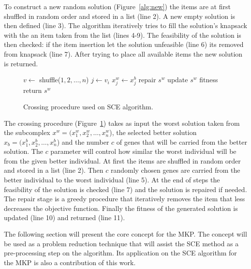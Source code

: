 To construct a new random solution (Figure~\ref{alg:new}) the items are
at first shuffled in random order and stored in a list (line 2).
A new empty solution is then defined (line 3).
The algorithm iteratively tries to fill the solution's knapsack with 
the an item taken from the list (lines 4-9).
The feasibility of the solution is then checked: if the item insertion let
the solution unfeasible (line 6) its removed from knapsack (line 7).
After trying to place all available items the new solution is returned.

\begin{figure}
\begin{algorithmic}[1]
    \State $v \leftarrow $ shuffle($1, 2, \ldots, n$)
	  \State $j \leftarrow v_i$
	  \State $x^w_j \leftarrow x^b_j$ 
	\EndFor
	  \State repair $s^w$
	\EndIf
	\State update $s^w$ fitness
  \State return $s^w$
  \EndProcedure
\end{algorithmic}
\caption{Crossing procedure used on SCE algorithm.}
\label{alg:cross}
\end{figure}

The crossing procedure (Figure~\ref{alg:cross}) takes as input the worst
solution taken from the subcomplex $x^w = (x^w_1, x^w_2, \ldots, x^w_n$),
the selected better solution $x_b = (x^b_1, x^b_2, \ldots, x^b_n$)
and the number $c$ of genes that will be carried from the better solution.
The $c$ parameter will control how similar the worst individual will be from the
given better individual.
At first the items are shuffled in random order and stored in a list (line 2).
Then $c$ randomly chosen genes are carried from the better individual to the worst
individual (line 5).
At the end of steps the feasibility of the solution is checked (line 7) and
the solution is repaired if needed.
The repair stage is a greedy procedure that iteratively removes the item that less
decreases the objective function.
Finally the fitness of the generated solution is updated (line 10) and
returned (line 11).

The following section will present the core concept for the MKP.
The concept will be used as a problem reduction
technique that will assist the SCE method as a pre-processing
step on the algorithm.
Its application on the SCE algorithm for the MKP is
also a contribution of this work.